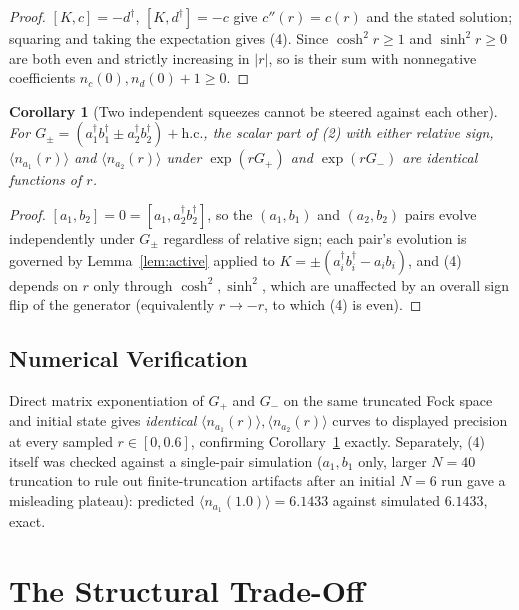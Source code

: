 \documentclass[12pt]{amsart}
\theoremstyle{plain}
\newtheorem{corollary}[theorem]{Corollary}
\theoremstyle{remark}
\begin{document}
\begin{proof}
$[K,c]=-d^\dagger$, $[K,d^\dagger]=-c$ give $c''(r)=c(r)$ and the stated solution; squaring and taking the expectation gives (4). Since $\cosh^2r\ge1$ and $\sinh^2r\ge0$ are both even and strictly increasing in $|r|$, so is their sum with nonnegative coefficients $n_c(0),n_d(0)+1\ge0$.
\end{proof}

\begin{corollary}[Two independent squeezes cannot be steered against each other]\label{cor:twosqueeze}
For $G_\pm=(a_1^\dagger b_1^\dagger\pm a_2^\dagger b_2^\dagger)+\mathrm{h.c.}$, the scalar part of (2) with either relative sign, $\langle n_{a_1}(r)\rangle$ and $\langle n_{a_2}(r)\rangle$ under $\exp(rG_+)$ and $\exp(rG_-)$ are identical functions of $r$.
\end{corollary}

\begin{proof}
$[a_1,b_2]=0=[a_1,a_2^\dagger b_2^\dagger]$, so the $(a_1,b_1)$ and $(a_2,b_2)$ pairs evolve independently under $G_\pm$ regardless of relative sign; each pair's evolution is governed by Lemma~\ref{lem:active} applied to $K=\pm(a_i^\dagger b_i^\dagger-a_ib_i)$, and (4) depends on $r$ only through $\cosh^2,\sinh^2$, which are unaffected by an overall sign flip of the generator (equivalently $r\to-r$, to which (4) is even).
\end{proof}

\subsection*{Numerical Verification}
Direct matrix exponentiation of $G_+$ and $G_-$ on the same truncated Fock space and initial state gives \emph{identical} $\langle n_{a_1}(r)\rangle,\langle n_{a_2}(r)\rangle$ curves to displayed precision at every sampled $r\in[0,0.6]$, confirming Corollary~\ref{cor:twosqueeze} exactly. Separately, (4) itself was checked against a single-pair simulation ($a_1,b_1$ only, larger $N=40$ truncation to rule out finite-truncation artifacts after an initial $N=6$ run gave a misleading plateau): predicted $\langle n_{a_1}(1.0)\rangle=6.1433$ against simulated $6.1433$, exact.

\section{The Structural Trade-Off}
\end{document}
